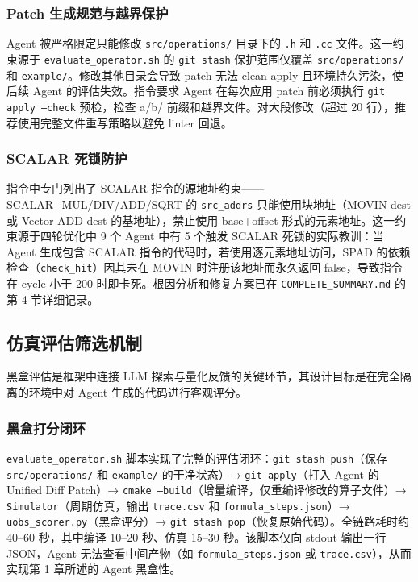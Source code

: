 \documentclass{CjC}
\begin{document}
\subsubsection{Patch 生成规范与越界保护}

Agent 被严格限定只能修改 \texttt{src/operations/} 目录下的 \texttt{.h} 和 \texttt{.cc} 文件。这一约束源于 \texttt{evaluate\_operator.sh} 的 \texttt{git stash} 保护范围仅覆盖 \texttt{src/operations/} 和 \texttt{example/}。修改其他目录会导致 patch 无法 clean apply 且环境持久污染，使后续 Agent 的评估失效。指令要求 Agent 在每次应用 patch 前必须执行 \texttt{git apply --check} 预检，检查 a/b/ 前缀和越界文件。对大段修改（超过 20 行），推荐使用完整文件重写策略以避免 linter 回退。

\subsubsection{SCALAR 死锁防护}

指令中专门列出了 SCALAR 指令的源地址约束——SCALAR\_MUL/DIV/ADD/SQRT 的 \texttt{src\_addrs} 只能使用块地址（MOVIN dest 或 Vector ADD dest 的基地址），禁止使用 base+offset 形式的元素地址。这一约束源于四轮优化中 9 个 Agent 中有 5 个触发 SCALAR 死锁的实际教训：当 Agent 生成包含 SCALAR 指令的代码时，若使用逐元素地址访问，SPAD 的依赖检查（\texttt{check\_hit}）因其未在 MOVIN 时注册该地址而永久返回 false，导致指令在 cycle 小于 200 时即卡死。根因分析和修复方案已在 \texttt{COMPLETE\_SUMMARY.md} 的第 4 节详细记录。

\subsection{仿真评估筛选机制}

黑盒评估是框架中连接 LLM 探索与量化反馈的关键环节，其设计目标是在完全隔离的环境中对 Agent 生成的代码进行客观评分。

\subsubsection{黑盒打分闭环}

\texttt{evaluate\_operator.sh} 脚本实现了完整的评估闭环：\texttt{git stash push}（保存 \texttt{src/operations/} 和 \texttt{example/} 的干净状态）→ \texttt{git apply}（打入 Agent 的 Unified Diff Patch）→ \texttt{cmake --build}（增量编译，仅重编译修改的算子文件）→ \texttt{Simulator}（周期仿真，输出 \texttt{trace.csv} 和 \texttt{formula\_steps.json}）→ \texttt{uobs\_scorer.py}（黑盒评分）→ \texttt{git stash pop}（恢复原始代码）。全链路耗时约 40--60 秒，其中编译 10--20 秒、仿真 15--30 秒。该脚本仅向 stdout 输出一行 JSON，Agent 无法查看中间产物（如 \texttt{formula\_steps.json} 或 \texttt{trace.csv}），从而实现第 1 章所述的 Agent 黑盒性。
\end{document}
